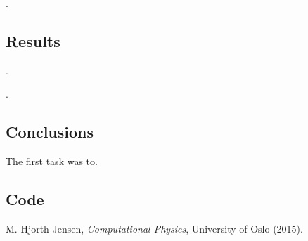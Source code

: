 \documentclass[11pt]{article}
\begin{document}
    . 

\subsection{Results}

    .



    .


\subsection{Conclusions}

    The first task was to.

\subsection{Code}

    

    

    

    

\begin{thebibliography}{1}

    M. Hjorth-Jensen, {\em Computational Physics}, University of Oslo (2015). 

\end{thebibliography}
\end{document}
